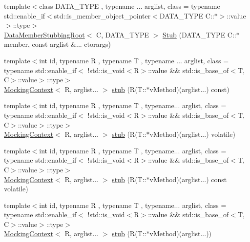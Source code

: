 \begin{DoxyCompactItemize}
{\footnotesize template$<$class D\+A\+T\+A\+\_\+\+T\+Y\+PE , typename ... arglist, class  = typename std\+::enable\+\_\+if$<$std\+::is\+\_\+member\+\_\+object\+\_\+pointer$<$\+D\+A\+T\+A\+\_\+\+T\+Y\+P\+E C\+::$\ast$$>$\+::value$>$\+::type$>$ }\\\mbox{\hyperlink{classfakeit_1_1DataMemberStubbingRoot}{Data\+Member\+Stubbing\+Root}}$<$ C, D\+A\+T\+A\+\_\+\+T\+Y\+PE $>$ \mbox{\hyperlink{classfakeit_1_1Mock_ae210824251ca071933f8a651bbe56047}{Stub}} (D\+A\+T\+A\+\_\+\+T\+Y\+PE C\+::$\ast$member, const arglist \&... ctorargs)
\item 
{\footnotesize template$<$int id, typename R , typename T , typename ... arglist, class  = typename std\+::enable\+\_\+if$<$                !std\+::is\+\_\+void$<$\+R$>$\+::value \&\& std\+::is\+\_\+base\+\_\+of$<$\+T, C$>$\+::value$>$\+::type$>$ }\\\mbox{\hyperlink{classfakeit_1_1MockingContext}{Mocking\+Context}}$<$ R, arglist... $>$ \mbox{\hyperlink{classfakeit_1_1Mock_a7a8f38b58b068b35f263eee42d75c162}{stub}} (R(T\+::$\ast$v\+Method)(arglist...) const)
\item 
{\footnotesize template$<$int id, typename R , typename T , typename... arglist, class  = typename std\+::enable\+\_\+if$<$                !std\+::is\+\_\+void$<$\+R$>$\+::value \&\& std\+::is\+\_\+base\+\_\+of$<$\+T, C$>$\+::value$>$\+::type$>$ }\\\mbox{\hyperlink{classfakeit_1_1MockingContext}{Mocking\+Context}}$<$ R, arglist... $>$ \mbox{\hyperlink{classfakeit_1_1Mock_a6974858200b57469de78bf2a06d6fa02}{stub}} (R(T\+::$\ast$v\+Method)(arglist...) volatile)
\item 
{\footnotesize template$<$int id, typename R , typename T , typename... arglist, class  = typename std\+::enable\+\_\+if$<$                !std\+::is\+\_\+void$<$\+R$>$\+::value \&\& std\+::is\+\_\+base\+\_\+of$<$\+T, C$>$\+::value$>$\+::type$>$ }\\\mbox{\hyperlink{classfakeit_1_1MockingContext}{Mocking\+Context}}$<$ R, arglist... $>$ \mbox{\hyperlink{classfakeit_1_1Mock_a963fce628ddab338bc3ee984a137db31}{stub}} (R(T\+::$\ast$v\+Method)(arglist...) const volatile)
\item 
{\footnotesize template$<$int id, typename R , typename T , typename... arglist, class  = typename std\+::enable\+\_\+if$<$                !std\+::is\+\_\+void$<$\+R$>$\+::value \&\& std\+::is\+\_\+base\+\_\+of$<$\+T, C$>$\+::value$>$\+::type$>$ }\\\mbox{\hyperlink{classfakeit_1_1MockingContext}{Mocking\+Context}}$<$ R, arglist... $>$ \mbox{\hyperlink{classfakeit_1_1Mock_a69141994a924c71af3bf9cb4d5a998b6}{stub}} (R(T\+::$\ast$v\+Method)(arglist...))

\end{DoxyCompactItemize}
